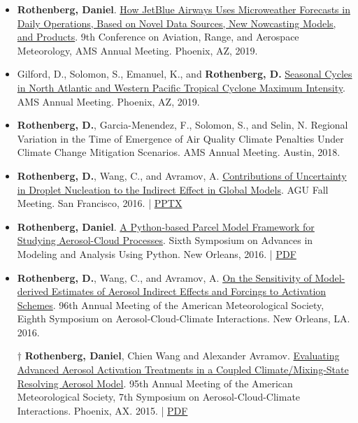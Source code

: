 \documentclass[11pt,letterpaper]{article}
\begin{document}
\begin{itemize}[itemindent=-10pt]
 \item \textbf{Rothenberg, Daniel}. \href{https://ams.confex.com/ams/2019Annual/webprogram/Paper353057.html}{How JetBlue Airways Uses Microweather Forecasts in Daily Operations, Based on Novel Data Sources, New Nowcasting Models, and Products}. 9th Conference on Aviation, Range, and Aerospace Meteorology, AMS Annual Meeting. Phoenix, AZ, 2019.

 \item Gilford, D., Solomon, S., Emanuel, K., and \textbf{Rothenberg, D.} \href{https://ams.confex.com/ams/2019Annual/meetingapp.cgi/Paper/349989}{Seasonal Cycles in North Atlantic and Western Pacific Tropical Cyclone Maximum Intensity}. AMS Annual Meeting. Phoenix, AZ, 2019.

 \item \textbf{Rothenberg, D.}, Garcia-Menendez, F., Solomon, S., and Selin, N. Regional Variation in the Time of Emergence of Air Quality Climate Penalties Under Climate Change Mitigation Scenarios. AMS Annual Meeting. Austin, 2018.

 \item \textbf{Rothenberg, D.}, Wang, C., and Avramov, A.
 \href{https://agu.confex.com/agu/fm16/meetingapp.cgi/Paper/193282}{Contributions of Uncertainty in Droplet Nucleation to the Indirect Effect in Global Models}. AGU Fall Meeting. San Francisco, 2016. | \href{https://figshare.com/articles/Contributions_of_Uncertainty_in_Droplet_Nucleation_to_the_Indirect_Effect_in_Global_Models/4503047}{PPTX}

 \item \textbf{Rothenberg, Daniel}. \href{https://ams.confex.com/ams/96Annual/webprogram/Paper286193.html}{A Python-based Parcel Model Framework for Studying Aerosol-Cloud Processes}. Sixth Symposium on Advances in Modeling and Analysis Using Python. New Orleans, 2016. | \href{https://figshare.com/articles/A_Python-based_Parcel_Model_Framework_for_Studying_Aerosol-Cloud_Processes/3475241}{PDF}

 \item \textbf{Rothenberg, D.}, Wang, C., and Avramov, A. \href{https://ams.confex.com/ams/96Annual/webprogram/Paper289914.html}{On the Sensitivity of Model-derived Estimates of Aerosol Indirect Effects and Forcings to Activation Schemes}. 96th Annual Meeting of the American Meteorological Society, Eighth Symposium on Aerosol-Cloud-Climate Interactions. New Orleans, LA. 2016.

 \item[$\dagger$] \textbf{Rothenberg, Daniel}, Chien Wang and Alexander Avramov. \href{https://ams.confex.com/ams/95Annual/webprogram/Paper268747.html}{Evaluating Advanced Aerosol Activation Treatments in a Coupled Climate/Mixing-State Resolving Aerosol Model}. 95th Annual Meeting of the American Meteorological Society, 7th Symposium on Aerosol-Cloud-Climate Interactions. Phoenix, AX. 2015. | \href{https://figshare.com/articles/Evaluating_Advanced_Aerosol_Activation_Treatments_in_a_Coupled_Climate_Mixing-State_Resolving_Aerosol_Model/3475226}{PDF}


\end{itemize}
\end{document}
